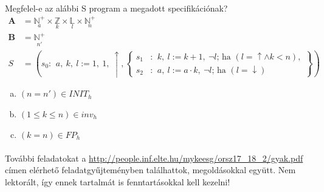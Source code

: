\documentclass[12pt]{article}
\begin{document}
\paragraph{}Megfelel-e az alábbi S program a megadott specifikációnak?
	\begin{align*}
	\textbf{A} &= \underset{a}{\mathbb{N}^+} \times \underset{k}{\mathbb{Z}} \times \underset{l}{\mathbb{L}} \times \underset{n}{\mathbb{N}^+}\\
	\textbf{B} &= \underset{n'}{\mathbb{N}^+} \\
	S &= \left(s_0 : \:\, a,\ k,\ l := 1,\ 1,\ \uparrow, \left\{
	\begin{aligned}
	s_1&: \:\, k,\ l := k+1,\ \neg l \text{; ha } (l = \uparrow \land k<n), \\
	s_2&: \:\, a,\ l := a \cdot k,\ \neg l \text{; ha } (l=\downarrow)
	\end{aligned}
	\right\} \right)
	\end{align*}
	
	\begin{enumerate}[a)]
		\item $(n=n')\in INIT_h$
		\item $(1\le k\le n) \in inv_h$
		\item $(k=n) \in FP_h$
	\end{enumerate}
	
\paragraph{}
	További feladatokat a \href{http://people.inf.elte.hu/mykeesg/orsz17_18_2/gyak.pdf}{http://people.inf.elte.hu/mykeesg/orsz17\_18\_2/gyak.pdf} címen elérhető feladatgyűjteményben találhattok, megoldásokkal együtt. Nem lektorált, így ennek tartalmát is fenntartásokkal kell kezelni!
	
	\newpage
\end{document}
